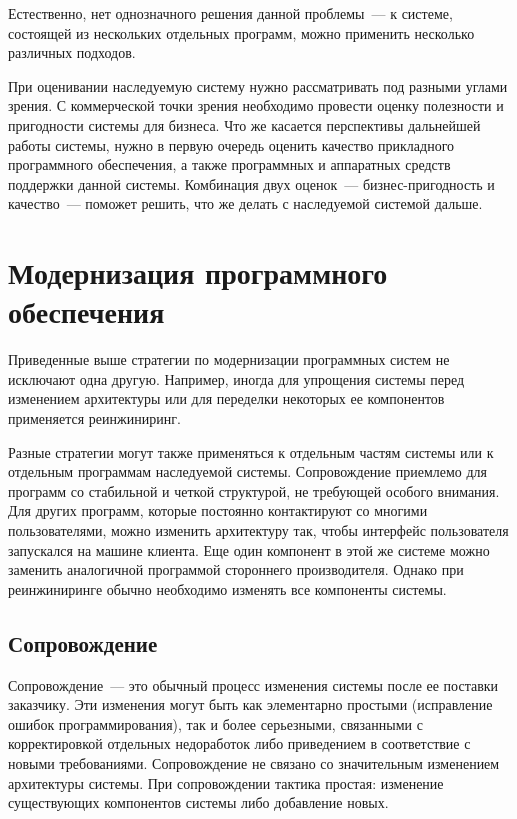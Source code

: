 \documentclass{../../text-style}
\begin{document}
Естественно, нет однозначного решения данной проблемы~--- к системе, состоящей из нескольких отдельных программ, можно применить несколько различных подходов.

При оценивании наследуемую систему нужно рассматривать под разными углами зрения. С коммерческой точки зрения необходимо провести оценку полезности и пригодности системы для бизнеса. Что же касается перспективы дальнейшей работы системы, нужно в первую очередь оценить качество прикладного программного обеспечения, а также программных и аппаратных средств поддержки данной системы. Комбинация двух оценок~--- бизнес-пригодность и качество~--- поможет решить, что же делать с наследуемой системой дальше.

\section{Модернизация программного обеспечения}

Приведенные выше стратегии по модернизации программных систем не исключают одна другую. Например, иногда для упрощения системы перед изменением архитектуры или для переделки некоторых ее компонентов применяется реинжиниринг.

Разные стратегии могут также применяться к отдельным частям системы или к отдельным программам наследуемой системы. Сопровождение приемлемо для программ со стабильной и четкой структурой, не требующей особого внимания. Для других программ, которые постоянно контактируют со многими пользователями, можно изменить архитектуру так, чтобы интерфейс пользователя запускался на машине клиента. Еще один компонент в этой же системе можно заменить аналогичной программой стороннего производителя. Однако при реинжиниринге обычно необходимо изменять все компоненты системы.

\subsection{Сопровождение}

Сопровождение~--- это обычный процесс изменения системы после ее поставки заказчику. Эти изменения могут быть как элементарно простыми (исправление ошибок программирования), так и более серьезными, связанными с корректировкой отдельных недоработок либо приведением в соответствие с новыми требованиями. Сопровождение не связано со значительным изменением архитектуры системы. При сопровождении тактика простая: изменение существующих компонентов системы либо добавление новых.
\end{document}
